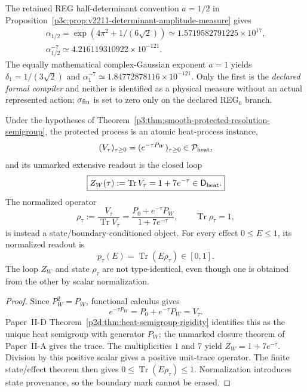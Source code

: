 \documentclass[12pt,a4paper]{article}
\begin{document}
\begin{remark}
\label{p3c:rem:v346-hierarchy-measure-scope}
The retained REG half-determinant convention $a=1/2$ in
Proposition~\ref{p3c:prop:v2211-determinant-amplitude-measure} gives
\[
\begin{gathered}
 \alpha_{1/2}=\exp(4\pi^2+1/(6\sqrt2))
 \simeq1.5719582791225\times10^{17},\\
 \boxed{\alpha_{1/2}^{-7}\simeq4.216119310922\times10^{-121}.}
\end{gathered}
\]
The equally mathematical complex-Gaussian exponent $a=1$ yields
$\delta_{1}=1/(3\sqrt2)$ and
$\alpha_1^{-7}\simeq1.84772878116\times10^{-121}$.
Only the first is the \emph{declared formal compiler} and neither is
identified as a physical measure without an actual represented action;
$\sigma_{\rm fin}$ is set to zero only on the declared REG$_0$ branch.
\end{remark}


\begin{corollary}
\label{p3c:cor:heat-loop-versus-normalized-state}
Under the hypotheses of
Theorem~\ref{p3:thm:smooth-protected-resolution-semigroup}, the protected
process is an atomic heat-process instance,
\[
 (V_\tau)_{\tau\ge0}
 =(e^{-\tau P_W})_{\tau\ge0}\in\mathcal P_{\rm heat},
\]
and its unmarked extensive readout is the closed loop
\[
 \boxed{Z_W(\tau):=\operatorname{Tr}V_\tau
 =1+7e^{-\tau}\in\mathsf D_{\mathrm{heat}}.}
\]
The normalized operator
\[
 \boxed{\rho_\tau:=\frac{V_\tau}{\operatorname{Tr}V_\tau}
 =\frac{P_0+e^{-\tau}P_W}{1+7e^{-\tau}},
 \qquad\operatorname{Tr}\rho_\tau=1,}
\]
is instead a state/boundary-conditioned object.  For every effect
\(0\le E\le1\), its normalized readout is
\[
 p_\tau(E)=\operatorname{Tr}(E\rho_\tau)\in[0,1].
\]
The loop \(Z_W\) and state \(\rho_\tau\) are not type-identical, even though
one is obtained from the other by scalar normalization.
\end{corollary}

\begin{proof}
Since \(P_W^2=P_W\), functional calculus gives
\[
 e^{-\tau P_W}=P_0+e^{-\tau}P_W=V_\tau.
\]
Paper~II-D Theorem~\ref{p2d:thm:heat-semigroup-rigidity} identifies this as
the unique heat semigroup with generator \(P_W\); the unmarked closure theorem
of Paper~II-A gives the trace.  The multiplicities \(1\) and \(7\) yield
\(Z_W=1+7e^{-\tau}\).  Division by this positive scalar gives a positive
unit-trace operator.  The finite state/effect theorem then gives
\(0\le\operatorname{Tr}(E\rho_\tau)\le1\).  Normalization introduces state
provenance, so the boundary mark cannot be erased.
\end{proof}
\end{document}
